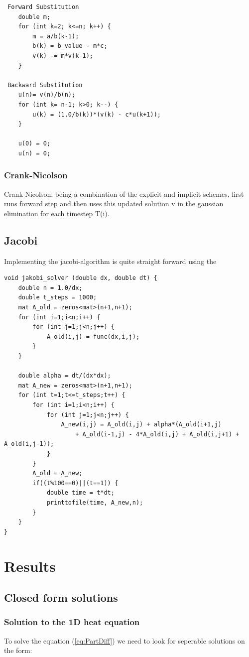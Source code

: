 \documentclass[a4paper,10pt]{article}
\begin{document}
\begin{verbatim}
 Forward Substitution
    double m;
    for (int k=2; k<=n; k++) {
        m = a/b(k-1);
        b(k) = b_value - m*c;
        v(k) -= m*v(k-1);
    }

 Backward Substitution
    u(n)= v(n)/b(n);
    for (int k= n-1; k>0; k--) {
        u(k) = (1.0/b(k))*(v(k) - c*u(k+1));
    }

    u(0) = 0;
    u(n) = 0;
\end{verbatim}

\subsubsection{Crank-Nicolson}
Crank-Nicolson, being a combination of the explicit and implicit schemes, first runs forward step and then uses this updated solution v in the gaussian elimination for each timestep T(i).

\subsection{Jacobi}
Implementing the jacobi-algorithm is quite straight forward using the 
\begin{verbatim}
void jakobi_solver (double dx, double dt) {
    double n = 1.0/dx;
    double t_steps = 1000;
    mat A_old = zeros<mat>(n+1,n+1);
    for (int i=1;i<n;i++) {
        for (int j=1;j<n;j++) {
            A_old(i,j) = func(dx,i,j);
        }
    }

    double alpha = dt/(dx*dx);
    mat A_new = zeros<mat>(n+1,n+1);
    for (int t=1;t<=t_steps;t++) {
        for (int i=1;i<n;i++) {
            for (int j=1;j<n;j++) {
                A_new(i,j) = A_old(i,j) + alpha*(A_old(i+1,j)
                    + A_old(i-1,j) - 4*A_old(i,j) + A_old(i,j+1) + A_old(i,j-1));
            }
        }
        A_old = A_new;
        if((t%100==0)||(t==1)) {
            double time = t*dt;
            printtofile(time, A_new,n);
        }
    }
} 
\end{verbatim}


\section{Results}
\subsection{Closed form solutions}
\subsubsection{Solution to the 1D heat equation}
To solve the equation (\ref{eq:PartDiff}) we need to look for seperable solutions on the form:
\end{document}
